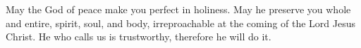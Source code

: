 \lettrine[lines=3]{M}{}ay the God of peace make you perfect in holiness. May he preserve you whole and entire, spirit, soul, and body, irreproachable at the coming of the Lord Jesus Christ. He who calls us is trustworthy, therefore he will do it.
